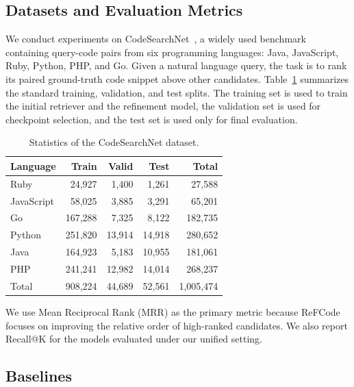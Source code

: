\documentclass[10pt,conference]{IEEEtran}
\newcommand{\method}{ReFCode}
\begin{document}
\subsection{Datasets and Evaluation Metrics}

We conduct experiments on CodeSearchNet~\cite{CodeSearchNet}, a widely used benchmark containing query-code pairs from six programming languages: Java, JavaScript, Ruby, Python, PHP, and Go. Given a natural language query, the task is to rank its paired ground-truth code snippet above other candidates. Table~\ref{tab:dataset_stats} summarizes the standard training, validation, and test splits. The training set is used to train the initial retriever and the refinement model, the validation set is used for checkpoint selection, and the test set is used only for final evaluation.

\begin{table}[!t]
\centering
\caption{Statistics of the CodeSearchNet dataset.}
\label{tab:dataset_stats}
\footnotesize
\setlength{\tabcolsep}{3.2pt}
\renewcommand{\arraystretch}{1.06}
\begin{tabular*}{\columnwidth}{@{\extracolsep{\fill}}lrrrr@{}}
\toprule
Language & Train & Valid & Test & Total \\
\midrule
Ruby       & 24,927  & 1,400  & 1,261  & 27,588 \\
JavaScript & 58,025  & 3,885  & 3,291  & 65,201 \\
Go         & 167,288 & 7,325  & 8,122  & 182,735 \\
Python     & 251,820 & 13,914 & 14,918 & 280,652 \\
Java       & 164,923 & 5,183  & 10,955 & 181,061 \\
PHP        & 241,241 & 12,982 & 14,014 & 268,237 \\
\midrule
Total      & 908,224 & 44,689 & 52,561 & 1,005,474 \\
\bottomrule
\end{tabular*}
\end{table}

We use Mean Reciprocal Rank (MRR) as the primary metric because \method{} focuses on improving the relative order of high-ranked candidates. We also report Recall@K for the models evaluated under our unified setting.

\subsection{Baselines}
\end{document}
